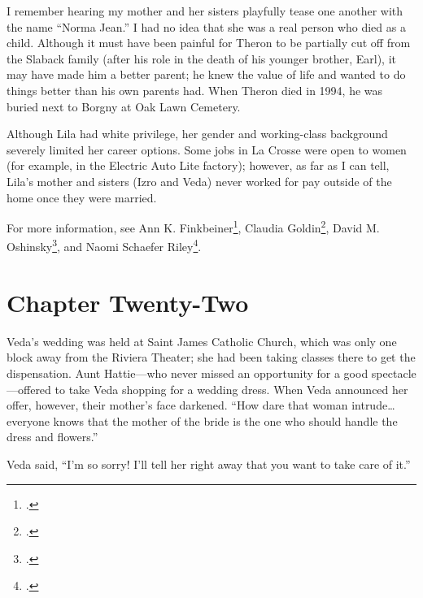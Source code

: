 \documentclass[
  letterpaper,
]{book}
\begin{document}
I remember hearing my mother and her sisters playfully tease one another
with the name ``Norma Jean.'' I had no idea that she was a real person
who died as a child. Although it must have been painful for Theron to be
partially cut off from the Slaback family (after his role in the death
of his younger brother, Earl), it may have made him a better parent; he
knew the value of life and wanted to do things better than his own
parents had. When Theron died in 1994, he was buried next to Borgny at
Oak Lawn Cemetery.

Although Lila had white privilege, her gender and working-class
background severely limited her career options. Some jobs in La Crosse
were open to women (for example, in the Electric Auto Lite factory);
however, as far as I can tell, Lila's mother and sisters (Izro and Veda)
never worked for pay outside of the home once they were married.

For more information, see Ann K. Finkbeiner\footnote{.}, Claudia Goldin\footnote{.}, David M. Oshinsky\footnote{.}, and Naomi
Schaefer Riley\footnote{.}.


\chapter{Chapter Twenty-Two}\label{chapter-twenty-two}

Veda's wedding was held at Saint James Catholic Church, which was only
one block away from the Riviera Theater; she had been taking classes
there to get the dispensation. Aunt Hattie---who never missed an
opportunity for a good spectacle---offered to take Veda shopping for a
wedding dress. When Veda announced her offer, however, their mother's
face darkened. ``How dare that woman intrude\ldots everyone knows that
the mother of the bride is the one who should handle the dress and
flowers.''

Veda said, ``I'm so sorry! I'll tell her right away that you want to
take care of it.''
\end{document}
